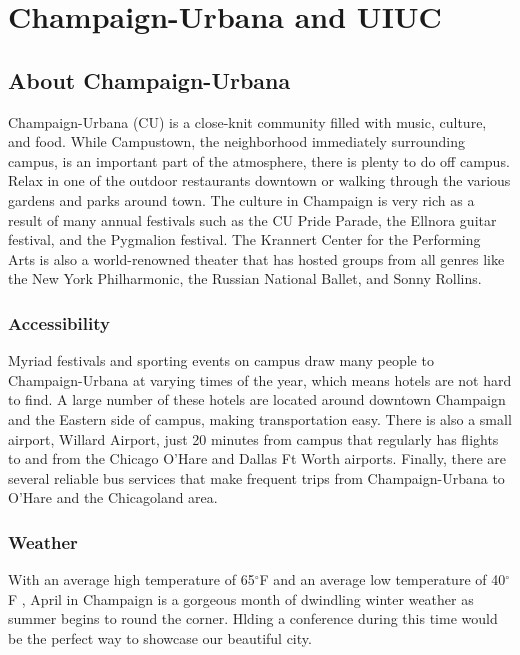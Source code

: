 \documentclass[12pt, letterpaper]{article}
\begin{document}
\newpage
\section{Champaign-Urbana and UIUC}
\subsection*{About Champaign-Urbana}
Champaign-Urbana (CU) is a close-knit community filled with music, culture, and food. While Campustown, the neighborhood immediately surrounding campus,  is an important part of the atmosphere, there is plenty to do off campus. Relax in one of the outdoor restaurants downtown or walking through the various gardens and parks around town. The culture in Champaign is very rich as a result of many annual festivals such as the CU Pride Parade, the Ellnora guitar festival, and the Pygmalion festival. The Krannert Center for the Performing Arts is also a world-renowned theater that has hosted groups from all genres like the New York Philharmonic, the Russian National Ballet, and Sonny Rollins.

\subsubsection*{Accessibility}
Myriad festivals and sporting events on campus draw many people to Champaign-Urbana at varying times of the year, which means hotels are not hard to find. A large number of these hotels are located around downtown Champaign and the Eastern side of campus, making transportation easy. There is also a small airport, Willard Airport, just 20 minutes from campus that regularly has flights to and from the Chicago O’Hare and Dallas Ft Worth airports. Finally, there are several reliable bus services that make frequent trips from Champaign-Urbana to O’Hare and the Chicagoland area.

\subsubsection*{Weather}
With an average high temperature of 65$^\circ$F and an average low temperature of 40$^\circ$F , April in Champaign is a gorgeous month of dwindling winter weather as summer begins to round the corner. Hlding a conference during this time would be the perfect way to showcase our beautiful city.
\end{document}
